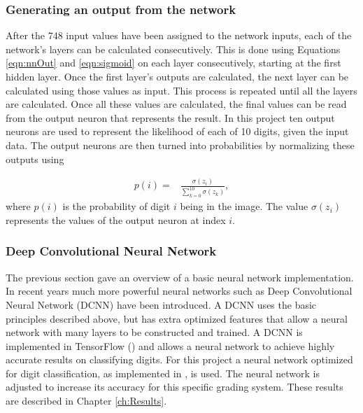 \subsubsection{Generating an output from the network}
After the 748 input values have been assigned to the network inputs, each of the network's layers can be calculated consecutively. This is done using Equations \ref{eqn:nnOut} and \ref{eqn:sigmoid} on each layer consecutively, starting at the first hidden layer. Once the first layer's outputs are calculated, the next layer can be calculated using those values as input. This process is repeated until all the layers are calculated. Once all these values are calculated, the final values can be read from the output neuron that represents the result. In this project ten output neurons are used to represent the likelihood of each of 10 digits, given the input data. The output neurons are then turned into probabilities by normalizing these outputs using


\begin{align}
  p(i) =  &\displaystyle{\frac{\sigma(z_{i})}{\sum_{k=0}^{10} \sigma(z_{k})}},
\label{eqn:normal}
\end{align}
where $p(i)$ is the probability of digit $i$ being in the image. The value $\sigma(z_{i})$ represents the values of the output neuron at index $i$.

\subsubsection{Deep Convolutional Neural Network}

The previous section gave an overview of a basic neural network implementation. In recent years much more powerful neural networks such as Deep Convolutional Neural Network (DCNN) have been introduced. A DCNN uses the basic principles described above, but has extra optimized features that allow a neural network with many layers to be constructed and trained. A DCNN is implemented in TensorFlow (\citet{Tensor}) and allows a neural network to achieve highly accurate results on classifying digits. For this project a neural network optimized for digit classification, as implemented in \citet{Tensor}, is used. The neural network is adjusted to increase its accuracy for this specific grading system. These results are described in Chapter \ref{ch:Results}.

